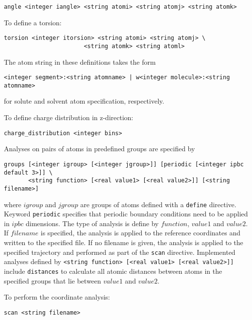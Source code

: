 \begin{verbatim}
angle <integer iangle> <string atomi> <string atomj> <string atomk> 
\end{verbatim}

To define a torsion:

\begin{verbatim}
torsion <integer itorsion> <string atomi> <string atomj> \
                       <string atomk> <string atoml> 
\end{verbatim}

The atom string in these definitions takes the form

\begin{verbatim}
<integer segment>:<string atomname> | w<integer molecule>:<string atomname>
\end{verbatim}

for solute and solvent atom specification, respectively.

To define charge distribution in z-direction:

\begin{verbatim}
charge_distribution <integer bins>
\end{verbatim}

Analyses on pairs of atoms in predefined groups are specified by

\begin{verbatim}
groups [<integer igroup> [<integer jgroup>]] [periodic [<integer ipbc default 3>]] \ 
       <string function> [<real value1> [<real value2>]] [<string filename>]
\end{verbatim}

where $igroup$ and $jgroup$ are groups of atoms defined with a
\verb+define+ directive. Keyword \verb+periodic+ specifies that
periodic boundary conditions need to be applied in $ipbc$ dimensions.
The type of analysis is define by $function$, $value1$ and $value2$.
If $filename$ is specified, the analysis is applied to the reference
coordinates and written to the specified file. If no filename is
given, the analysis is applied to the specified trajectory and 
performed as part of the \verb+scan+ directive.
Implemented analyses defined by 
\verb+<string function> [<real value1> [<real value2>]]+ include
\verb+distances+ to calculate all atomic distances between atoms
in the specified groups that lie between $value1$ and $value2$.

To perform the coordinate analysis:

\begin{verbatim}
scan <string filename>
\end{verbatim}

